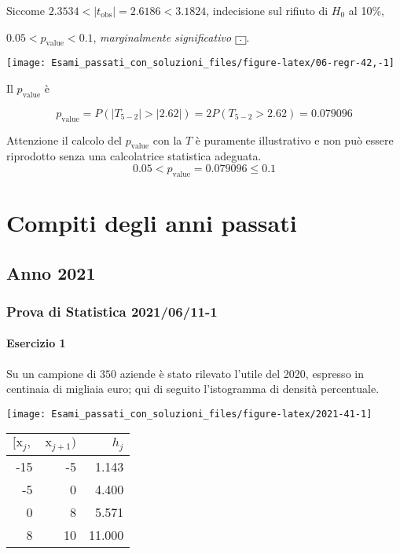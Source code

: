 \documentclass[
  11pt,
]{book}
\theoremstyle{mytheoremstyle}
\theoremstyle{mydefstyle}
\newenvironment{sol}
  {
  \begin{tcolorbox}[enhanced,breakable,arc=0.1mm,boxrule=1pt,colback=white,colframe=iblue,
  title=\bf \fontfamily{lmss}\selectfont \hspace{.5 cm} Soluzione,drop fuzzy shadow]

}{
\end{tcolorbox}
  }
\begin{document}
\begin{sol}
Siccome \(2.3534<|t_\text{obs}|=2.6186<3.1824\), indecisione sul rifiuto di \(H_0\) al 10\%,

\(0.05<p_\text{value}<0.1\), \emph{marginalmente significativo} \(\fbox{.}\).

\begin{center}\texttt{[image: Esami\_passati\_con\_soluzioni\_files/figure-latex/06-regr-42,-1]} \end{center}

Il \(p_{\text{value}}\) è

\[ p_{\text{value}} = P(|T_{5-2}|>|2.62|)=2P(T_{5-2}>2.62)=0.079096 \]

Attenzione il calcolo del \(p_\text{value}\) con la \(T\) è puramente illustrativo e non può essere riprodotto senza una calcolatrice statistica adeguata.\[
 0.05 < p_\text{value}= 0.079096 \leq 0.1 
\]

\end{sol}

\part{Compiti degli anni passati}

\chapter{Anno 2021}\label{anno-2021}

\section{Prova di Statistica 2021/06/11-1}\label{prova-di-statistica-20210611-1}

\subsection{Esercizio 1}\label{esercizio-1-4}

Su un campione di \(350\) aziende è stato rilevato l'utile del 2020, espresso in centinaia di migliaia euro;
qui di seguito l'istogramma di densità percentuale.

\begin{center}\texttt{[image: Esami\_passati\_con\_soluzioni\_files/figure-latex/2021-41-1]} \end{center}

\begin{table}[H]
\centering
\begin{tabular}{rrr}
\toprule
$[\text{x}_j,$ & $\text{x}_{j+1})$ & $h_j$\\
\midrule
-15 & -5 & 1.143\\
-5 & 0 & 4.400\\
0 & 8 & 5.571\\
8 & 10 & 11.000\\
\bottomrule
\end{tabular}
\end{table}
\end{document}
